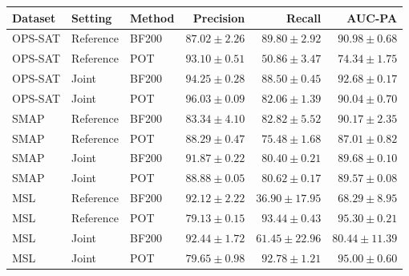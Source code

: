 \begin{tabular}{@{}lllrrr@{}}
\toprule
Dataset & Setting & Method & Precision & Recall & AUC-PA \\
\midrule
\acs{OPS-SAT} & Reference & BF200 & \(\num{87.02}\pm\num{2.26}\) & \(\num{89.80}\pm\num{2.92}\) & \(\num{90.98}\pm\num{0.68}\) \\
\acs{OPS-SAT} & Reference & \acs{POT} & \(\num{93.10}\pm\num{0.51}\) & \(\num{50.86}\pm\num{3.47}\) & \(\num{74.34}\pm\num{1.75}\) \\
\acs{OPS-SAT} & Joint & BF200 & \(\num{94.25}\pm\num{0.28}\) & \(\num{88.50}\pm\num{0.45}\) & \(\num{92.68}\pm\num{0.17}\) \\
\acs{OPS-SAT} & Joint & \acs{POT} & \(\num{96.03}\pm\num{0.09}\) & \(\num{82.06}\pm\num{1.39}\) & \(\num{90.04}\pm\num{0.70}\) \\
\addlinespace
\acs{SMAP} & Reference & BF200 & \(\num{83.34}\pm\num{4.10}\) & \(\num{82.82}\pm\num{5.52}\) & \(\num{90.17}\pm\num{2.35}\) \\
\acs{SMAP} & Reference & \acs{POT} & \(\num{88.29}\pm\num{0.47}\) & \(\num{75.48}\pm\num{1.68}\) & \(\num{87.01}\pm\num{0.82}\) \\
\acs{SMAP} & Joint & BF200 & \(\num{91.87}\pm\num{0.22}\) & \(\num{80.40}\pm\num{0.21}\) & \(\num{89.68}\pm\num{0.10}\) \\
\acs{SMAP} & Joint & \acs{POT} & \(\num{88.88}\pm\num{0.05}\) & \(\num{80.62}\pm\num{0.17}\) & \(\num{89.57}\pm\num{0.08}\) \\
\addlinespace
\acs{MSL} & Reference & BF200 & \(\num{92.12}\pm\num{2.22}\) & \(\num{36.90}\pm\num{17.95}\) & \(\num{68.29}\pm\num{8.95}\) \\
\acs{MSL} & Reference & \acs{POT} & \(\num{79.13}\pm\num{0.15}\) & \(\num{93.44}\pm\num{0.43}\) & \(\num{95.30}\pm\num{0.21}\) \\
\acs{MSL} & Joint & BF200 & \(\num{92.44}\pm\num{1.72}\) & \(\num{61.45}\pm\num{22.96}\) & \(\num{80.44}\pm\num{11.39}\) \\
\acs{MSL} & Joint & \acs{POT} & \(\num{79.65}\pm\num{0.98}\) & \(\num{92.78}\pm\num{1.21}\) & \(\num{95.00}\pm\num{0.60}\) \\
\bottomrule
\end{tabular}
